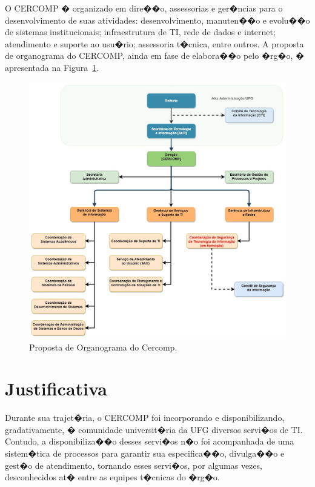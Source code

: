 O CERCOMP � organizado em dire��o, assessorias e ger�ncias para o desenvolvimento de suas atividades: desenvolvimento, manuten��o e evolu��o de sistemas institucionais; infraestrutura de TI, rede de dados e internet; atendimento e suporte ao usu�rio; assessoria t�cnica, entre outros. A proposta de organograma do CERCOMP, ainda em fase de elabora��o pelo �rg�o, � apresentada na Figura~\ref{fig:organograma-cercomp}.

\begin{figure}[!hb]
  \centering
  \includegraphics[width=1\textwidth]{./fig/organograma-cercomp-completo.jpg}
  \caption[Proposta de Organograma do CERCOMP.]{Proposta de Organograma do Cercomp.}
  \label{fig:organograma-cercomp}
\end{figure}

\section{Justificativa}
\label{sec:justificativa}

Durante sua trajet�ria, o CERCOMP foi incorporando e disponibilizando, gradativamente, � comunidade universit�ria da UFG diversos servi�os de TI. Contudo, a disponibiliza��o desses servi�os n�o foi acompanhada de uma sistem�tica de processos para garantir sua especifica��o, divulga��o e gest�o de atendimento, tornando esses servi�os, por algumas vezes, desconhecidos at� entre as equipes t�cnicas do �rg�o.

